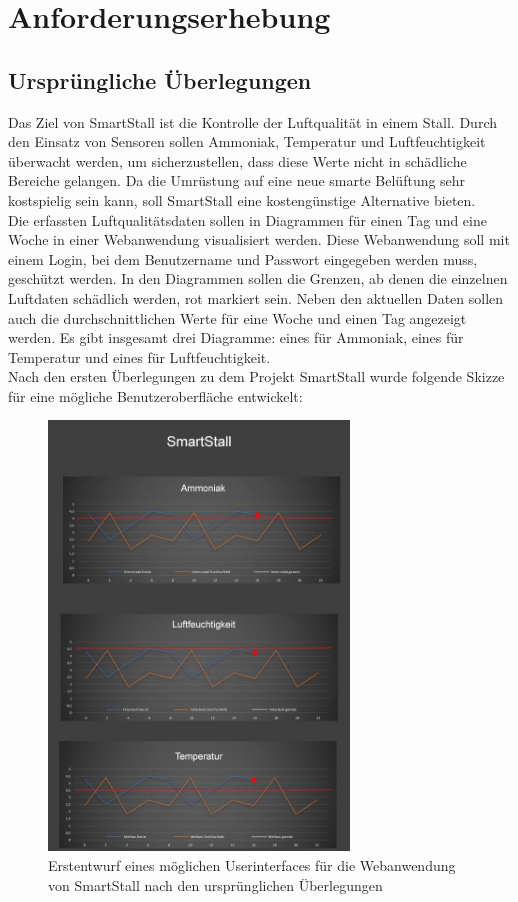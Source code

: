 \documentclass[conference]{IEEEtran}
\begin{document}
\section{Anforderungserhebung}
\subsection{Ursprüngliche Überlegungen}
Das Ziel von SmartStall ist die Kontrolle der Luftqualität in einem Stall. Durch den Einsatz von Sensoren sollen Ammoniak, Temperatur und Luftfeuchtigkeit überwacht werden, um sicherzustellen, dass diese Werte nicht in schädliche Bereiche gelangen. Da die Umrüstung auf eine neue smarte Belüftung sehr kostspielig sein kann, soll SmartStall eine kostengünstige Alternative bieten. \\
Die erfassten Luftqualitätsdaten sollen in Diagrammen für einen Tag und eine Woche in einer Webanwendung visualisiert werden. Diese Webanwendung soll mit einem Login, bei dem Benutzername und Passwort eingegeben werden muss, geschützt werden. In den Diagrammen sollen die Grenzen, ab denen die einzelnen Luftdaten schädlich werden, rot markiert sein. Neben den aktuellen Daten sollen auch die durchschnittlichen Werte für eine Woche und einen Tag angezeigt werden. Es gibt insgesamt drei Diagramme: eines für Ammoniak, eines für Temperatur und eines für Luftfeuchtigkeit. \\
Nach den ersten Überlegungen zu dem Projekt SmartStall wurde folgende Skizze für eine mögliche Benutzeroberfläche entwickelt:
\begin{figure}[H]
	\centering
	\includegraphics[width=80mm]{fig/firstUI.JPG}
	\caption{Erstentwurf eines möglichen Userinterfaces für die Webanwendung von SmartStall nach den ursprünglichen Überlegungen}
	\label{firstUI}
\end{figure}
\end{document}
